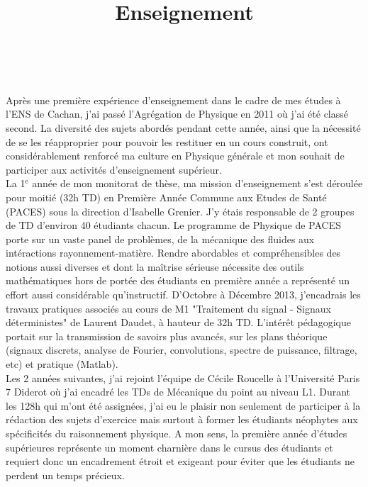 \documentclass[paper=a4, fontsize=12pt,twoside]{scrartcl}
\title{	
\vspace*{-2.5cm}
\normalfont \normalsize 
\horrule{0.5pt} \\[0.4cm] %
\huge Enseignement \\ %
\horrule{2pt} \\[0.5cm] %
}
\date{} %
\begin{document}
\maketitle
\thispagestyle{empty}

\vspace*{-3cm}

\indent \indent Apr\`es une premi\`ere exp\'erience d'enseignement dans le cadre de mes \'etudes \`a l'ENS de Cachan, j'ai pass\'e l'Agr\'egation de Physique en 2011 o\`u j'ai \'et\'e class\'e second. La diversit\'e des sujets abord\'es pendant cette ann\'ee, ainsi que la n\'ecessit\'e de se les r\'eapproprier pour pouvoir les restituer en un cours construit, ont consid\'erablement renforc\'e ma culture en Physique g\'en\'erale et mon souhait de participer aux activit\'es d'enseignement sup\'erieur.\\
\indent La 1$^{\text{e}}$ ann\'ee de mon monitorat de th\`ese, ma mission d'enseignement s'est d\'eroul\'ee pour moiti\'e (32h TD) en Premi\`ere Ann\'ee Commune aux Etudes de Sant\'e (PACES) sous la direction d'Isabelle Grenier. J'y \'etais responsable de 2 groupes de TD d'environ 40 \'etudiants chacun. Le programme de Physique de PACES porte sur un vaste panel de probl\`emes, de la m\'ecanique des fluides aux int\'eractions rayonnement-mati\`ere. Rendre abordables et compr\'ehensibles des notions aussi diverses et dont la ma\^itrise s\'erieuse n\'ecessite des outils math\'ematiques hors de port\'ee des \'etudiants en premi\`ere ann\'ee a repr\'esent\'e un effort aussi consid\'erable qu'instructif. D'Octobre \`a D\'ecembre 2013, j'encadrais les travaux pratiques associ\'es au cours de M1 "Traitement du signal - Signaux d\'eterministes" de Laurent Daudet, \`a hauteur de 32h TD. L'int\'er\^et p\'edagogique portait sur la transmission de savoirs plus avanc\'es, sur les plans th\'eorique (signaux discrets, analyse de Fourier, convolutions, spectre de puissance, filtrage, etc) et pratique (Matlab).\\
\indent Les 2 ann\'ees suivantes, j'ai rejoint l'\'equipe de C\'ecile Roucelle \`a l'Universit\'e Paris 7 Diderot o\`u j'ai encadr\'e les TDs de M\'ecanique du point au niveau L1. Durant les 128h qui m'ont \'et\'e assign\'ees, j'ai eu le plaisir non seulement de participer \`a la r\'edaction des sujets d'exercice mais surtout \`a former les \'etudiants n\'eophytes aux sp\'ecificit\'es du raisonnement physique. A mon sens, la premi\`ere ann\'ee d'\'etudes sup\'erieures repr\'esente un moment charni\`ere dans le cursus des \'etudiants et requiert donc un encadrement \'etroit et exigeant pour \'eviter que les \'etudiants ne perdent un temps pr\'ecieux.\\
\end{document}
